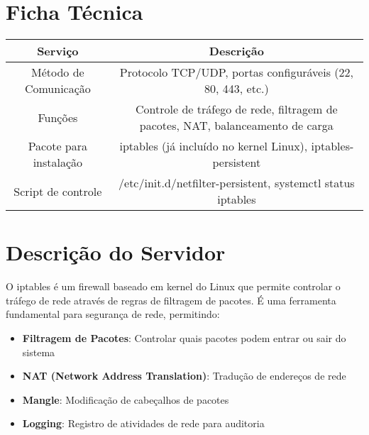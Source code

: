 \documentclass[12pt,fleqn]{article}
\begin{document}
\pagestyle {empty}


\newpage


\pagestyle {plain}

\setcounter{page}{0} 

\setlength{\parindent}{0in}  %
\parskip 5pt  


\section {Ficha Técnica}  

\begin{tabular}{|c|c|}
	\hline
	\textbf{Serviço} & \textbf{Descrição}\\\hline 
	Método de Comunicação & Protocolo TCP/UDP, portas configuráveis (22, 80, 443, etc.) \\\hline
	Funções & Controle de tráfego de rede, filtragem de pacotes, NAT, balanceamento de carga\\\hline
	Pacote para instalação & iptables (já incluído no kernel Linux), iptables-persistent\\\hline
	Script de controle & /etc/init.d/netfilter-persistent, systemctl status iptables\\\hline
\end{tabular}

\section{Descrição do Servidor}

O iptables é um firewall baseado em kernel do Linux que permite controlar o tráfego de rede através de regras de filtragem de pacotes. É uma ferramenta fundamental para segurança de rede, permitindo:

\begin{itemize}
    \item \textbf{Filtragem de Pacotes}: Controlar quais pacotes podem entrar ou sair do sistema
    \item \textbf{NAT (Network Address Translation)}: Tradução de endereços de rede
    \item \textbf{Mangle}: Modificação de cabeçalhos de pacotes
    \item \textbf{Logging}: Registro de atividades de rede para auditoria
\end{itemize}
\end{document}
